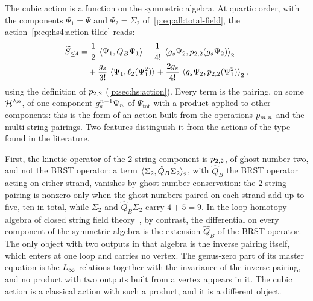 The cubic action is a function on the symmetric algebra.
At quartic order, with the components $\Psi_1 = \Psi$ and $\Psi_2 = \Sigma_2$ of~\eqref{p:eq:all:total-field}, the action~\eqref{p:eq:hs4:action-tilde} reads:
\begin{equation}
  \label{p:eq:ibl:action-components}
  \begin{aligned}
    \caction[\le 4]
      &
      = \frac{1}{2} \, \pair{\Psi_1}{Q_B \Psi_1}
        - \frac{1}{4!} \, \pair[2]{\gs \Psi_2}{\sprod{2}{2}(\gs \Psi_2)}
      \\ &
      \quad
      + \frac{\gs}{3!} \, \pair{\Psi_1}{\ell_2(\Psi_1^2)}
        + \frac{2 \gs}{4!} \, \pair[2]{\gs \Psi_2}{\sprod{2}{2}(\Psi_1^2)},
  \end{aligned}
\end{equation}
using the definition of $\sprod{2}{2}$ (\cref{p:sec:hs:action}).
Every term is the pairing, on some $\Hn{n}$, of one component $\gs^{n-1} \Psi_n$ of $\Psi_{\mathrm{tot}}$ with a product applied to other components: this is the form of an action built from the operations $\sprod{m}{n}$ and the multi-string pairings.
Two features distinguish it from the actions of the \IBL{} type found in the literature.

First, the kinetic operator of the $2$-string component is $\sprod{2}{2}$, of ghost number two, and not the BRST operator: a term $\pair[2]{\Sigma_2}{\hat Q_B \Sigma_2}$, with $\hat Q_B$ the BRST operator acting on either strand, vanishes by ghost-number conservation: the $2$-string pairing is nonzero only when the ghost numbers paired on each strand add up to five, ten in total, while $\Sigma_2$ and $\hat Q_B \Sigma_2$ carry $4 + 5 = 9$.
In the loop homotopy algebra of closed string field theory~\cite{Markl:2001:LoopHomotopyAlgebras, Muenster:2013:QuantumOpenClosedHomotopy, Muenster:2014:HomotopyClassificationBosonic}, by contrast, the differential on every component of the symmetric algebra is the extension $\hat Q_B$ of the BRST operator.
The only object with two outputs in that algebra is the inverse pairing itself, which enters at one loop and carries no vertex.
The genus-zero part of its master equation is the $\Loo$ relations together with the invariance of the inverse pairing, and no product with two outputs built from a vertex appears in it.
The cubic action is a classical action with such a product, and it is a different object.

